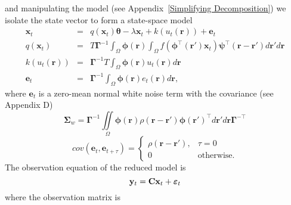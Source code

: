 \documentclass[onecolumn,draftcls]{IEEEtran}
\begin{document}
and manipulating the model (see Appendix~\ref{Simplifying Decomposition}) we isolate the state vector to form a state-space model
\begin{eqnarray}\label{Homogeneous SS Model}
	\mathbf{x}_t &=& q(\mathbf{x}_t)\boldsymbol{\theta} - \lambda\mathbf{x}_t + k\left(u_t\left(\mathbf{r}\right)\right) + \mathbf{e}_t \\
	q\left(\mathbf{x}_t\right) &=& T\boldsymbol{\Gamma}^{ - 1}\int_\Omega {\boldsymbol{\phi}\left(\mathbf{r}\right) \int_\Omega {f\left(\boldsymbol{\phi}^{\top}\left(\mathbf{r}'\right)\mathbf{x}_t\right)\boldsymbol{\psi}^{\top} \left(\mathbf{r}-\mathbf{r}'\right)d\mathbf{r}'} d\mathbf{r}} \\
	k(u_t(\mathbf{r})) &=& \boldsymbol{\Gamma}^{-1}T \int_\Omega{\boldsymbol{\phi} \left(\mathbf{r}\right) u_t\left(\mathbf{r}\right)d\mathbf{r}} \\
	\mathbf{e}_t &=& \boldsymbol{\Gamma}^{-1}\int_\Omega{\boldsymbol{\phi}\left(\mathbf{r}\right)e_t\left(\mathbf{r}\right)d\mathbf{r}},
\end{eqnarray}
where $\mathbf{e}_t$ is a zero-mean normal white noise term with the covariance (see Appendix D)
\begin{equation} 
\boldsymbol{\Sigma}_w=\boldsymbol{\Gamma}^{-1}\iint\limits_{\Omega}\boldsymbol{\phi}\left(\mathbf r\right) \rho\left(\mathbf{r}- \mathbf{r}' \right)\boldsymbol{\phi}\left(\mathbf{r}'\right)^{\top}d\mathbf{r}' d\mathbf{r}\boldsymbol{\Gamma}^{- \top} 
\end{equation}
\begin{equation}
 cov(\mathbf{e}_t,\mathbf{e}_{t+\tau})=
\begin{cases}
\rho\left(\mathbf{r}-\mathbf{r'}\right), & \tau=0 \\
0 & \mathrm{otherwise}.
\end{cases}
\label{eq:FieldCovariance}
\end{equation}
The observation equation of the reduced model is
\begin{equation}\label{ObservationEquation}
    \mathbf{y}_t = \mathbf{C}\mathbf{x}_t + \boldsymbol{\varepsilon}_t \\
\end{equation}
where the observation matrix is
\end{document}

